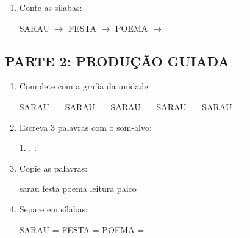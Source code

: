 \begin{exercicio}
\begin{enumerate}
  \item Conte as sílabas:
  \begin{center}
  SARAU $\rightarrow$ \underline{\hspace{0.9cm}} \quad FESTA $\rightarrow$ \underline{\hspace{0.9cm}} \quad POEMA $\rightarrow$ \underline{\hspace{0.9cm}}
  \end{center}

\end{enumerate}

\subsection*{PARTE 2: PRODUÇÃO GUIADA}

\begin{enumerate}[resume]

  \item Complete com a grafia da unidade:
  \begin{center}
  SARAU\underline{~~~} \quad SARAU\underline{~~~} \quad SARAU\underline{~~~} \quad SARAU\underline{~~~} \quad SARAU\underline{~~~}
  \end{center}

  \item Escreva 3 palavras com o som-alvo:
  \begin{center}
  1. \underline{\hspace{3cm}} . \underline{\hspace{3cm}} . \underline{\hspace{3cm}}
  \end{center}

  \item Copie as palavras:
  \begin{center}
  sarau \quad festa \quad poema \quad leitura \quad palco
  \end{center}

  \item Separe em sílabas:
  \begin{center}
  SARAU = \underline{\hspace{1cm}} \underline{\hspace{1cm}} \quad FESTA = \underline{\hspace{1cm}} \underline{\hspace{1cm}} \quad POEMA = \underline{\hspace{1cm}} \underline{\hspace{1cm}}
  \end{center}


\end{enumerate}
\end{exercicio}

